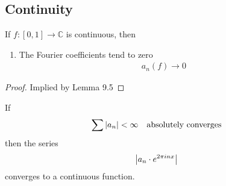\subsection{Continuity}
\begin{proposition}
    If $f: [0, 1] \to \mathbb{C}$ is continuous, then
    \begin{enumerate}
        \item The Fourier coefficients tend to zero
        \begin{align}
            a_n(f) \to 0
        \end{align}
    \end{enumerate}
\end{proposition}
\begin{proof}
    Implied by Lemma 9.5
\end{proof}
\begin{proposition}
    If
    \begin{align}
        \sum \abs{a_n} < \infty && \text{absolutely converges}
    \end{align}
    then the series
    \begin{align}
        \abs{a_n \cdot e^{2\pi in x}}
    \end{align}
    converges to a continuous function.
\end{proposition}
